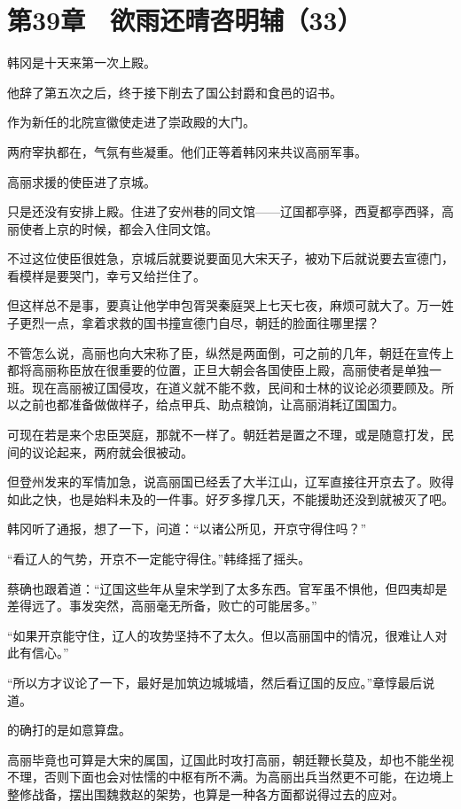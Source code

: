 \section{第39章　欲雨还晴咨明辅（33）}

韩冈是十天来第一次上殿。

他辞了第五次之后，终于接下削去了国公封爵和食邑的诏书。

作为新任的北院宣徽使走进了崇政殿的大门。

两府宰执都在，气氛有些凝重。他们正等着韩冈来共议高丽军事。

高丽求援的使臣进了京城。

只是还没有安排上殿。住进了安州巷的同文馆——辽国都亭驿，西夏都亭西驿，高丽使者上京的时候，都会入住同文馆。

不过这位使臣很姓急，京城后就要说要面见大宋天子，被劝下后就说要去宣德门，看模样是要哭门，幸亏又给拦住了。

但这样总不是事，要真让他学申包胥哭秦庭哭上七天七夜，麻烦可就大了。万一姓子更烈一点，拿着求救的国书撞宣德门自尽，朝廷的脸面往哪里摆？

不管怎么说，高丽也向大宋称了臣，纵然是两面倒，可之前的几年，朝廷在宣传上都将高丽称臣放在很重要的位置，正旦大朝会各国使臣上殿，高丽使者是单独一班。现在高丽被辽国侵攻，在道义就不能不救，民间和士林的议论必须要顾及。所以之前也都准备做做样子，给点甲兵、助点粮饷，让高丽消耗辽国国力。

可现在若是来个忠臣哭庭，那就不一样了。朝廷若是置之不理，或是随意打发，民间的议论起来，两府就会很被动。

但登州发来的军情加急，说高丽国已经丢了大半江山，辽军直接往开京去了。败得如此之快，也是始料未及的一件事。好歹多撑几天，不能援助还没到就被灭了吧。

韩冈听了通报，想了一下，问道：“以诸公所见，开京守得住吗？”

“看辽人的气势，开京不一定能守得住。”韩绛摇了摇头。

蔡确也跟着道：“辽国这些年从皇宋学到了太多东西。官军虽不惧他，但四夷却是差得远了。事发突然，高丽毫无所备，败亡的可能居多。”

“如果开京能守住，辽人的攻势坚持不了太久。但以高丽国中的情况，很难让人对此有信心。”

“所以方才议论了一下，最好是加筑边城城墙，然后看辽国的反应。”章惇最后说道。

的确打的是如意算盘。

高丽毕竟也可算是大宋的属国，辽国此时攻打高丽，朝廷鞭长莫及，却也不能坐视不理，否则下面也会对怯懦的中枢有所不满。为高丽出兵当然更不可能，在边境上整修战备，摆出围魏救赵的架势，也算是一种各方面都说得过去的应对。

